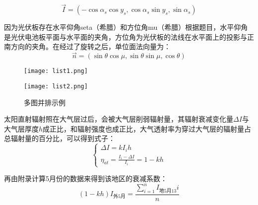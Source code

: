 \documentclass[withoutpreface,bwprint]{cumcmthesis} %
\begin{document}
\begin{equation}
	\overrightarrow{I} = (-\cos \alpha_{s}\cos y_{s}, \cos \alpha_{s}\sin y_{s},\sin \alpha_{s})
	\label{eq:004}
\end{equation}

因为光伏板存在水平仰角seta（希腊）和方位角mu（希腊）根据题目，水平仰角是光伏电池板平面与水平面的夹角，方位角为光伏板的法线在水平面上的投影与正南方向的夹角。在经过了旋转之后，单位面法向量为：
\begin{equation}
	\overrightarrow{n} = (\sin \theta \cos \mu,\sin \theta \sin \mu,\cos \theta)
	\label{eq:004}
\end{equation}

\begin{figure}
	\centering
	\begin{minipage}[c]{0.48\textwidth}
		\centering
		\texttt{[image: list1.png]}
	\end{minipage}
	\begin{minipage}[c]{0.48\textwidth}
		\centering
		\texttt{[image: list2.png]}
	\end{minipage}
	\caption{多图并排示例}
\end{figure}

太阳直射辐射照在大气层过后，会被大气层削弱辐射量，其辐射衰减变化量$\Delta I$与大气层厚度$h$成正比，和辐射强度也成正比，大气透射率为穿过大气层的辐射量占总辐射量的百分比，可以得到式子：
\begin{equation}
	\begin{cases}
		\Delta I = kI_{i}h \\
		\eta_{at} = \frac{I_{i} - \Delta I}{I_{i}} = 1-kh 
	\end{cases}
	\label{eq:012}
\end{equation}

再由附录计算5月份的数据来得到该地区的衰减系数：
\begin{equation}
	(1-kh)I_{\mbox{外5月}} = \frac{\sum_{i = 1}^{n} I_{\mbox{地5月13}} i}{n}
	\label{eq:013}
\end{equation}
\end{document}
